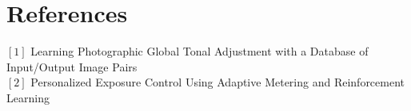 \documentclass{article}
\begin{document}
\begin{figure}[H]
\hspace{0.05\textwidth}
\end{figure}

\section{References}
$[1]$ Learning Photographic Global Tonal Adjustment with a Database of Input/Output Image Pairs \\
$[2]$ Personalized Exposure Control Using Adaptive Metering and Reinforcement Learning

\end{document}
